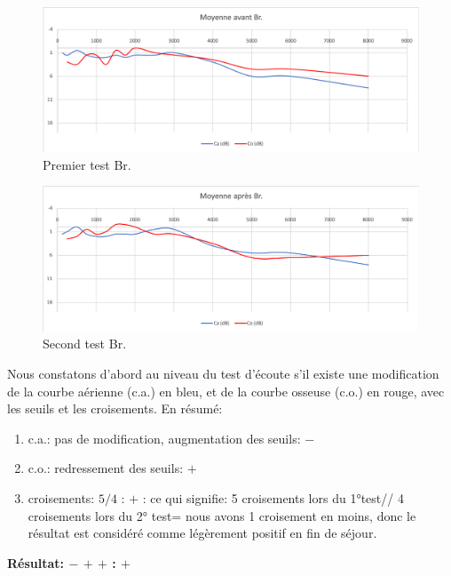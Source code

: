   
  \begin{figure}[ht]
\centering
\includegraphics[width=0.7\linewidth]{images/graphiques/bru_pre.png}
\caption[  \textbf{Groupe Contrôle}: Patient Br.. 1° test]{Premier test Br.}
\end{figure}



 \begin{figure}[th]
\centering
\includegraphics[width=0.7\linewidth]{images/graphiques/bru_post.png}
\caption[Patient Br. :  2° test]{Second test Br.}

\end{figure}

Nous constatons d'abord au niveau du test d'écoute s'il existe une modification de la courbe aérienne 
(c.a.) en bleu, et de la courbe osseuse 
(c.o.)  en rouge, avec les seuils et les croisements. En résumé:

	\begin{enumerate}
 		\item  c.a.: pas de modification, augmentation des
                  seuils: $-$
 		\item  c.o.: redressement des seuils: $+$
 		\item  croisements: $5/4$ : $+$ : ce qui signifie:  5 croisements lors du 1°test// 4 croisements lors du 
 		2° test= nous avons 1 croisement en moins, donc le résultat est considéré comme légèrement 
 		positif en fin
                  de séjour.
                \end{enumerate}

                \textbf{ Résultat:  $- $  $+ $   $+ $     :   $+$}
                
